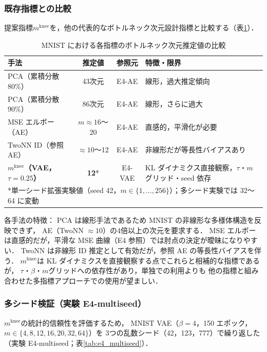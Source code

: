 \documentclass[11pt,a4paper]{jsarticle}
\newcommand{\mknee}{m^{\mathrm{knee}}}
\begin{document}
\subsubsection{既存指標との比較}\label{sec:exp_comparison}

提案指標$\mknee$を，他の代表的なボトルネック次元設計指標と比較する（表\ref{tab:method_comparison}）．

\begin{table}[H]
\centering
\caption{MNIST における各指標のボトルネック次元推定値の比較}
\label{tab:method_comparison}
\small
\begin{tabular}{lccl}
\toprule
手法 & 推定値 & 参照元 & 特徴・限界 \\
\midrule
PCA（累積分散80\%） & 43次元 & E4-AE & 線形，過大推定傾向 \\
PCA（累積分散90\%） & 86次元 & E4-AE & 線形，さらに過大 \\
MSE エルボー（AE） & $m \approx 16$〜20 & E4-AE & 直感的，平滑化が必要 \\
TwoNN ID（参照AE） & $\approx 10$〜12 & E4-AE & 非線形だが等長性バイアスあり \\
\textbf{$\mknee$（VAE，$\tau=0.25$）} & \textbf{12}* & E4-VAE & KL ダイナミクス直接観察，$\tau$・$m$グリッド・seed 依存 \\
\multicolumn{4}{l}{*単一シード拡張実験値（seed 42，$m \in \{1,\ldots,256\}$）；多シード実験では 32〜64 に変動} \\
\bottomrule
\end{tabular}
\end{table}

各手法の特徴：
PCA は線形手法であるため MNIST の非線形な多様体構造を反映できず，
AE（TwoNN $\approx 10$）の4倍以上の次元を要求する．
MSE エルボーは直感的だが，平滑な MSE 曲線（E4 参照）では肘点の決定が曖昧になりやすい．
TwoNN は非線形 ID 推定として有効だが，参照 AE の等長性バイアスを伴う．
$\mknee$は KL ダイナミクスを直接観察する点でこれらと相補的な指標であるが，
$\tau$・$\beta$・$m$グリッドへの依存性があり，単独での利用よりも
他の指標と組み合わせた多指標アプローチでの使用が望ましい．

\subsubsection{多シード検証（実験 E4-multiseed）}\label{sec:exp_multiseed}

$\mknee$の統計的信頼性を評価するため，
MNIST VAE（$\beta = 4$，150 エポック，$m \in \{4,8,12,16,20,32,64\}$）を
3つの乱数シード（42，123，777）で繰り返した（実験 E4-multiseed；表\ref{tab:e4_multiseed}）．
\end{document}
